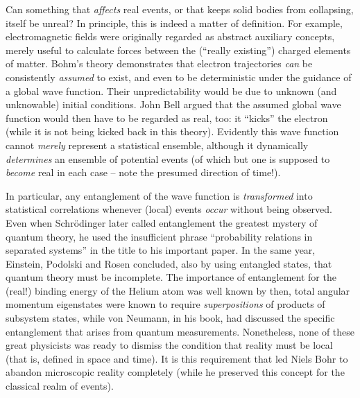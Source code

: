 \documentclass[12pt]{article}
\begin{document}
Can something that {\it affects} real events, or that keeps
solid bodies from collapsing, itself be unreal? In principle, this is
indeed a matter of definition. For example, electromagnetic fields were
originally regarded as abstract auxiliary concepts, merely useful to
calculate forces between the (``really existing'') charged elements of
matter. Bohm's theory demonstrates that electron trajectories
{\it can} be consistently {\it assumed} to exist, and even to be
deterministic under the guidance of a global wave function. Their
unpredictability would be due to unknown (and unknowable) initial
conditions. John Bell \cite{Bell} argued that the assumed
global wave function would then have to be regarded as real, too: it
``kicks'' the electron (while it is not being kicked back in this
theory). Evidently this wave function cannot {\it merely} represent a
statistical ensemble, although it dynamically {\it determines} an
ensemble of potential events (of which but one is supposed to {\it
become} real in each case -- note the presumed direction of time!).

In particular, any entanglement of the wave function is
{\it transformed} into statistical correlations
whenever (local) events {\it occur} without being observed. Even when
Schr\"odinger \cite{Schr} later called entanglement the greatest
mystery of quantum theory, he used the insufficient phrase
``probability relations in separated systems'' in the title to his
important paper. In the same year, Einstein, Podolski and Rosen
  concluded, also by
using entangled states, that quantum theory must be incomplete. The
importance of entanglement for the (real!) binding energy of the Helium
atom was well known by then, total angular momentum eigenstates were
known to require {\it superpositions} of products of subsystem states,
while von Neumann, in his book, had discussed the specific
entanglement that arises from quantum measurements. Nonetheless, none
of these great physicists was ready to dismiss the condition that
reality must be local (that is, defined in space and time). It is this
requirement that led Niels Bohr to abandon microscopic reality
completely (while he preserved this concept for the classical realm of
events).
\end{document}

